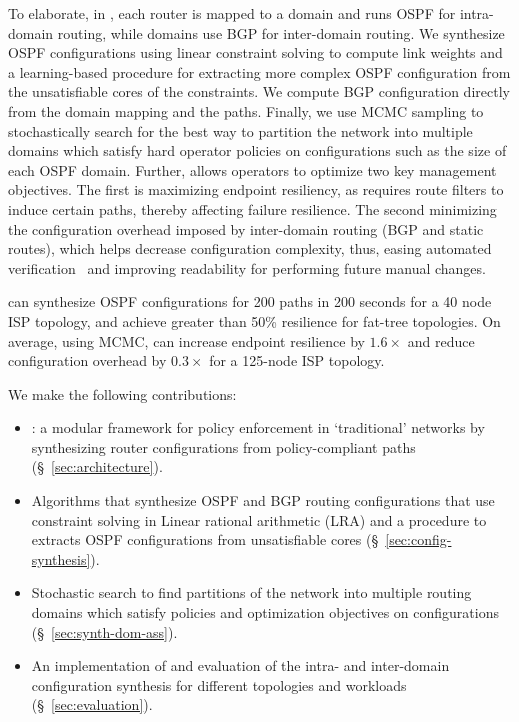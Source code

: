 To elaborate, in \name, each router is mapped to a domain and runs
OSPF for intra-domain routing, while domains use BGP for inter-domain
routing. 
We synthesize OSPF configurations using linear constraint solving to compute
link weights and 
a learning-based procedure for extracting more complex OSPF configuration from
the unsatisfiable cores of the constraints.
We compute BGP configuration directly from the domain mapping and the paths.
Finally, we use MCMC sampling to stochastically search for the best way to
partition the network into multiple domains which satisfy hard
operator policies on configurations such as  the size of each OSPF
domain. Further, \name allows operators to optimize two key management
objectives. The first is maximizing endpoint resiliency, as \name
requires route filters to induce certain paths, thereby affecting
failure resilience. The second minimizing the configuration overhead imposed
by inter-domain routing (BGP and static routes), which helps decrease
configuration complexity, thus, easing automated
verification~\cite{batfish, arc, era} and improving readability for
performing future manual changes.

\name can synthesize OSPF configurations for 200 paths in 200
seconds for a 40 node ISP topology, and achieve greater than 
50\% resilience for fat-tree topologies.
 On average, using MCMC, \name can increase
endpoint resilience by $1.6\times$ and 
reduce configuration overhead
by $0.3\times$
for a 125-node ISP topology.



 We make the following contributions:
\begin{itemize}
	\item \name: a modular framework 
	for policy enforcement in `traditional' networks
	by synthesizing router configurations from policy-compliant paths (\S~\ref{sec:architecture}). 
	\item Algorithms that synthesize OSPF and BGP routing configurations that use
	constraint solving in Linear rational arithmetic (LRA) and 
	a procedure to extracts OSPF configurations from 
	unsatisfiable cores (\S~\ref{sec:config-synthesis}). 
	\item Stochastic search to find 
	partitions of the network into multiple routing domains which
	satisfy policies and optimization objectives on configurations (\S~\ref{sec:synth-dom-ass}).
	\item An implementation of \name and evaluation of the 
	intra- and inter-domain configuration synthesis for different
	topologies and workloads (\S~\ref{sec:evaluation}). 
\end{itemize}
